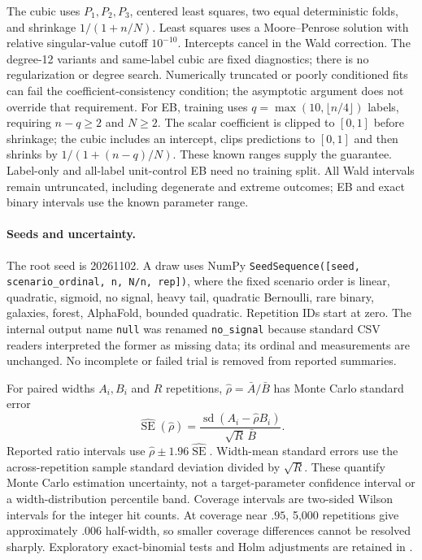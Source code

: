 The cubic uses $P_1,P_2,P_3$, centered least squares, two equal deterministic folds, and shrinkage $1/(1+n/N)$. Least squares uses a Moore--Penrose solution with relative singular-value cutoff $10^{-10}$. Intercepts cancel in the Wald correction. The degree-12 variants and same-label cubic are fixed diagnostics; there is no regularization or degree search. Numerically truncated or poorly conditioned fits can fail the coefficient-consistency condition; the asymptotic argument does not override that requirement. For EB, training uses $q=\max(10,\lfloor n/4\rfloor)$ labels, requiring $n-q\ge2$ and $N\ge2$. The scalar coefficient is clipped to $[0,1]$ before shrinkage; the cubic includes an intercept, clips predictions to $[0,1]$ and then shrinks by $1/(1+(n-q)/N)$. These known ranges supply the guarantee. Label-only and all-label unit-control EB need no training split. All Wald intervals remain untruncated, including degenerate and extreme outcomes; EB and exact binary intervals use the known parameter range.

\paragraph{Seeds and uncertainty.}
The root seed is 20261102. A draw uses NumPy \texttt{SeedSequence([seed, scenario\_ordinal, n, N/n, rep])}, where the fixed scenario order is linear, quadratic, sigmoid, no signal, heavy tail, quadratic Bernoulli, rare binary, galaxies, forest, AlphaFold, bounded quadratic. Repetition IDs start at zero. The internal output name \texttt{null} was renamed \texttt{no\_signal} because standard CSV readers interpreted the former as missing data; its ordinal and measurements are unchanged. No incomplete or failed trial is removed from reported summaries.

For paired widths $A_i,B_i$ and $R$ repetitions, $\widehat\rho=\bar A/\bar B$ has Monte Carlo standard error
\[
 \widehat{\operatorname{SE}}(\widehat\rho)
 =\frac{\operatorname{sd}(A_i-\widehat\rho B_i)}{\sqrt R\,\bar B}.
\]
Reported ratio intervals use $\widehat\rho\pm1.96\widehat{\operatorname{SE}}$. Width-mean standard errors use the across-repetition sample standard deviation divided by $\sqrt R$. These quantify Monte Carlo estimation uncertainty, not a target-parameter confidence interval or a width-distribution percentile band. Coverage intervals are two-sided Wilson intervals for the integer hit counts. At coverage near $.95$, 5,000 repetitions give approximately $.006$ half-width, so smaller coverage differences cannot be resolved sharply. Exploratory exact-binomial tests and Holm adjustments are retained in .

